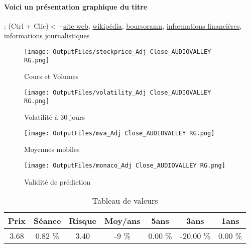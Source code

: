\documentclass[11pt,a4paper]{report}%
\begin{document}
\paragraph{Voici un présentation graphique du titre} : (Ctrl + Clic)$<-$\href{https://www.audiovalley.com/investisseurs/analystes/}{site web}, \href{https://fr.wikipedia.org/wiki/Radionomy}{wikipédia}, \href{https://www.boursorama.com/cours/1rPALAVY}{boursorama}, \href{https://www.qwant.com/?q=site:https:%2f%2fwww.easybourse.com%2faction-societe%2fAUDIOVALLEY-RG&t=web&client=ext-firefox-hp}{informations financières}, \href{https://bourse.lerevenu.com/cours-de-bourse/fiche-valeur-synthese/AUDIOVALLEY-RG/ALAVY-FR}{informations journalistiques}
\begin{figure}[!htb]
   \begin{minipage}{0.5\textwidth}
     \centering
     \texttt{[image: OutputFiles/stockprice\_Adj Close\_AUDIOVALLEY RG.png]}
     \caption{Cours et Volumes}\label{Fig:price_AUDIOVALLEY RG}
   \end{minipage}\hfill
   \begin{minipage}{0.5\textwidth}
     \centering
     \texttt{[image: OutputFiles/volatility\_Adj Close\_AUDIOVALLEY RG.png]}
     \caption{Volatilité à 30 jours}\label{Fig:volat_AUDIOVALLEY RG}
   \end{minipage}
\end{figure}
\begin{figure}[!htb]
   \begin{minipage}{0.5\textwidth}
     \centering
     \texttt{[image: OutputFiles/mva\_Adj Close\_AUDIOVALLEY RG.png]}
     \caption{Moyennes mobiles}\label{Fig:mva_AUDIOVALLEY RG}
   \end{minipage}\hfill
   \begin{minipage}{0.5\textwidth}
     \centering
     \texttt{[image: OutputFiles/monaco\_Adj Close\_AUDIOVALLEY RG.png]}
     \caption{Validité de prédiction}\label{Fig:prediction_AUDIOVALLEY RG}
   \end{minipage}
\end{figure}

\begin{table}[H]
  \centering
    \begin{tabular}{|c|c|c|c|c|c|c|}
    \hline
    Prix & Séance & Risque  & Moy/ans & 5ans & 3ans & 1ans \\
    \hline
    3.68 &    0.82 \%    & 3.40 & -9 \% & 0.00 \% & -20.00 \% & 0.00 \% \\
    \hline
    \end{tabular}%
        \label{tab:table_AUDIOVALLEY RG}%
      \caption{Tableau de valeurs}
\end{table}%
\end{document}

